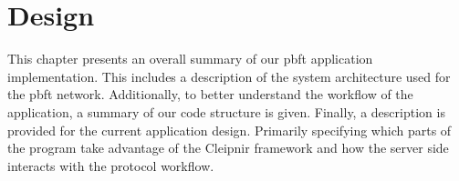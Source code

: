 \chapter{Design}
\label{chapter:Design}

This chapter presents an overall summary of our \ac{pbft} application implementation. This includes a description of the system architecture used for the \ac{pbft} network. Additionally, to better understand the workflow of the application, a summary of our code structure is given. Finally, a description is provided for the current application design. Primarily specifying which parts of the program take advantage of the Cleipnir framework and how the server side interacts with the protocol workflow.
